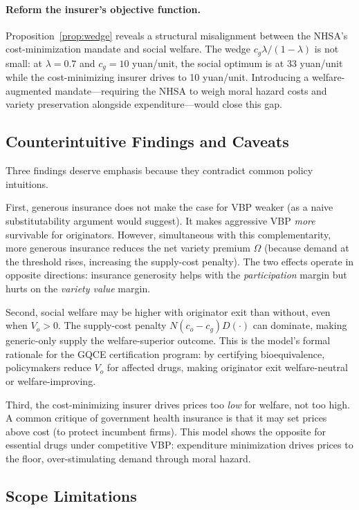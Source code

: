 \documentclass[12pt]{article}
\theoremstyle{plain}
\theoremstyle{definition}
\theoremstyle{remark}
\newcommand{\1}{\mathbf{1}}
\begin{document}
\paragraph{Reform the insurer's objective function.} Proposition~\ref{prop:wedge} reveals a structural misalignment between the NHSA's cost-minimization mandate and social welfare. The wedge $c_g\lambda/(1-\lambda)$ is not small: at $\lambda = 0.7$ and $c_g = 10$ yuan/unit, the social optimum is at 33 yuan/unit while the cost-minimizing insurer drives to 10 yuan/unit. Introducing a welfare-augmented mandate---requiring the NHSA to weigh moral hazard costs and variety preservation alongside expenditure---would close this gap.

\subsection{Counterintuitive Findings and Caveats}

Three findings deserve emphasis because they contradict common policy intuitions.

First, generous insurance does not make the case for VBP weaker (as a naive substitutability argument would suggest). It makes aggressive VBP \emph{more} survivable for originators. However, simultaneous with this complementarity, more generous insurance reduces the net variety premium $\Omega$ (because demand at the threshold rises, increasing the supply-cost penalty). The two effects operate in opposite directions: insurance generosity helps with the \emph{participation} margin but hurts on the \emph{variety value} margin.

Second, social welfare may be higher with originator exit than without, even when $V_o > 0$. The supply-cost penalty $N(c_o - c_g)D(\cdot)$ can dominate, making generic-only supply the welfare-superior outcome. This is the model's formal rationale for the GQCE certification program: by certifying bioequivalence, policymakers reduce $V_o$ for affected drugs, making originator exit welfare-neutral or welfare-improving.

Third, the cost-minimizing insurer drives prices too \emph{low} for welfare, not too high. A common critique of government health insurance is that it may set prices above cost (to protect incumbent firms). This model shows the opposite for essential drugs under competitive VBP: expenditure minimization drives prices to the floor, over-stimulating demand through moral hazard.

\subsection{Scope Limitations}
\end{document}
